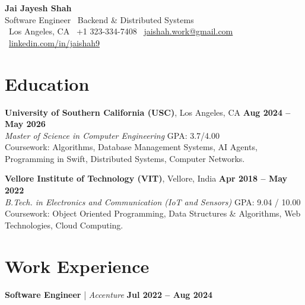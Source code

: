 \documentclass[letterpaper,11pt]{article}
\begin{document}
\begin{center}
    {\LARGE \textbf{Jai Jayesh Shah}}\\
    {\normalsize Software Engineer \textbar\ Backend \& Distributed Systems}\\
    \small
    \faMapMarker*\ Los Angeles, CA
    \quad
    \faPhone*\ +1 323-334-7408
    \quad
    \faEnvelope\ \href{mailto:jaishah.work@gmail.com} {jaishah.work@gmail.com}
    \quad
    \faLinkedin\ \href{https://www.linkedin.com/in/jaishah9} {linkedin.com/in/jaishah9}
\end{center}
\vspace{-13pt}


\section*{Education}
\textbf{University of Southern California (USC)}, Los Angeles, CA \hfill \textbf{Aug 2024 -- May 2026} \\
\textit{Master of Science in Computer Engineering} \hfill GPA: 3.7/4.00 \\
Coursework: Algorithms, Database Management Systems, AI Agents, Programming in Swift, Distributed Systems, Computer Networks.

\vspace{1pt}

\textbf{Vellore Institute of Technology (VIT)}, Vellore, India \hfill \textbf{Apr 2018 -- May 2022} \\
\textit{B.Tech. in Electronics and Communication (IoT and Sensors)} \hfill GPA: 9.04 / 10.00 \\
Coursework: Object Oriented Programming, Data Structures \& Algorithms, Web Technologies, Cloud Computing.

\section*{Work Experience}

\textbf{Software Engineer} \;|\;\hspace{.1cm} \textit{Accenture} \hfill \textbf{Jul 2022 -- Aug 2024} \\
\end{document}
